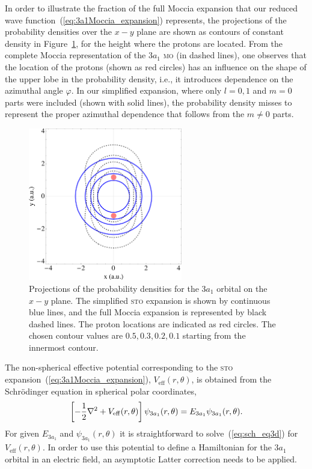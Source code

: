 In order to illustrate the fraction of the full Moccia expansion that
our reduced wave function~(\ref{eq:3a1Moccia_expansion}) represents,
the projections of the probability densities over the $x-y$ plane are
shown as contours of constant density in
Figure~\ref{fig:3a1_xycontours}, for the height where the protons are
located. From the complete Moccia representation of the $3a_{1}$
\textsc{mo} (in dashed lines), one observes that the location of the
protons (shown as red circles) has an influence on the shape of the
upper lobe in the probability density, i.e., it introduces dependence
on the azimuthal angle $\varphi$. In our simplified expansion, where
only $l=0,1$ and $m=0$ parts were included (shown with solid lines),
the probability density misses to represent the proper azimuthal
dependence that follows from the $m\neq 0$ parts.

\begin{figure}
  \centering
  \includegraphics[width=0.6\textwidth]{figures/ch_H2O/3a1/orbitals3a1.eps}
  \caption{Projections of the probability densities for the $3a_{1}$
    orbital on the $x-y$ plane. The simplified \textsc{sto} expansion
    is shown by continuous blue lines, and the full Moccia expansion
    is represented by black dashed lines. The proton locations are
    indicated as red circles. The chosen contour values are $0.5, 0.3,
    0.2, 0.1$ starting from the innermost contour.}
  \label{fig:3a1_xycontours}
\end{figure}

The non-spherical effective potential corresponding to the
\textsc{sto} expansion~(\ref{eq:3a1Moccia_expansion}),
$V_{\mathrm{eff}}(r,\theta)$, is obtained from the Schr\"{o}dinger
equation in spherical polar coordinates,
%
\begin{eqnarray}
  \left[ -\frac{1}{2} \nabla^{2} +
  V_{\rm{eff}}(r,\theta) \right] \psi_{3a_{1}}(r,\theta) =
  E_{3a_{1}} \psi_{3a_{1}}(r,\theta).
\label{eq:sch_eq3d}
\end{eqnarray}
%
For given $E_{3a_{1}}$ and $\psi_{3a_{1}}(r,\theta)$ it is
straightforward to solve~(\ref{eq:sch_eq3d}) for
$V_{\mathrm{eff}}(r,\theta)$. In order to use this potential to define
a Hamiltonian for the $3a_{1}$ orbital in an electric field, an
asymptotic Latter correction needs to be applied.

